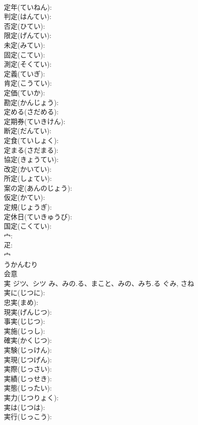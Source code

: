 \documentclass[8pt]{extreport}
\begin{document}
\begin{CJK}{UTF8}{min}
\\	定年(ていねん): 
\\	判定(はんてい): 
\\	否定(ひてい): 
\\	限定(げんてい): 
\\	未定(みてい): 
\\	固定(こてい): 
\\	測定(そくてい): 
\\	定義(ていぎ): 
\\	肯定(こうてい): 
\\	定価(ていか): 
\\	勘定(かんじょう): 
\\	定める(さだめる): 
\\	定期券(ていきけん): 
\\	断定(だんてい): 
\\	定食(ていしょく): 
\\	定まる(さだまる): 
\\	協定(きょうてい): 
\\	改定(かいてい): 
\\	所定(しょてい): 
\\	案の定(あんのじょう): 
\\	仮定(かてい): 
\\	定規(じょうぎ): 
\\	定休日(ていきゅうび): 
\\	国定(こくてい): 
\\	宀: 
\\	疋: 
\\	宀	
\\	うかんむり	
\\	会意 
\\	実	ジツ、シツ	み、みの.る、まこと、みの、みち.る	ぐみ, さね	
\\	実に(じつに): 
\\	忠実(まめ): 
\\	現実(げんじつ): 
\\	事実(じじつ): 
\\	実施(じっし): 
\\	確実(かくじつ): 
\\	実験(じっけん): 
\\	実現(じつげん): 
\\	実際(じっさい): 
\\	実績(じっせき): 
\\	実態(じったい): 
\\	実力(じつりょく): 
\\	実は(じつは): 
\\	実行(じっこう): 

\end{CJK}
\end{document}
